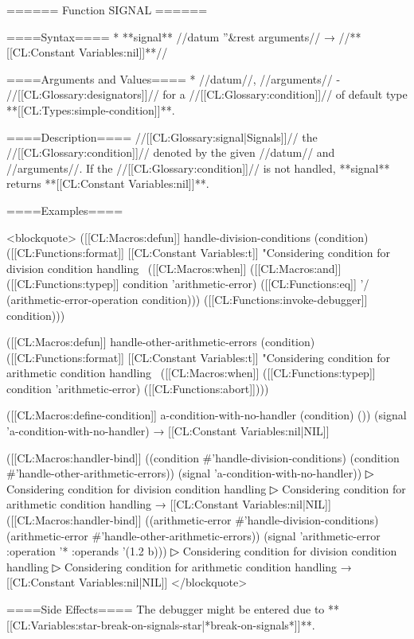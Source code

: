 ====== Function SIGNAL ======

====Syntax====
  * **signal** //datum ''&rest arguments// → //**[[CL:Constant Variables:nil]]**//

====Arguments and Values====
  * //datum//, //arguments// - //[[CL:Glossary:designators]]// for a //[[CL:Glossary:condition]]// of default type **[[CL:Types:simple-condition]]**.

====Description====
//[[CL:Glossary:signal|Signals]]// the //[[CL:Glossary:condition]]// denoted by the given //datum// and //arguments//. If the //[[CL:Glossary:condition]]// is not handled, **signal** returns **[[CL:Constant Variables:nil]]**.

====Examples====

<blockquote>
([[CL:Macros:defun]] handle-division-conditions (condition) 
  ([[CL:Functions:format]] [[CL:Constant Variables:t]] "Considering condition for division condition handling~%
          ([[CL:Macros:when]] ([[CL:Macros:and]] ([[CL:Functions:typep]] condition 'arithmetic-error) 
                     ([[CL:Functions:eq]] '/ (arithmetic-error-operation condition))) 
            ([[CL:Functions:invoke-debugger]] condition))) 

([[CL:Macros:defun]] handle-other-arithmetic-errors (condition) 
  ([[CL:Functions:format]] [[CL:Constant Variables:t]] "Considering condition for arithmetic condition handling~%
    ([[CL:Macros:when]] ([[CL:Functions:typep]] condition 'arithmetic-error) ([[CL:Functions:abort]]))) 

([[CL:Macros:define-condition]] a-condition-with-no-handler (condition) ())
(signal 'a-condition-with-no-handler) → [[CL:Constant Variables:nil|NIL]] 

([[CL:Macros:handler-bind]] ((condition #'handle-division-conditions) 
               (condition #'handle-other-arithmetic-errors)) 
  (signal 'a-condition-with-no-handler)) 
▷ Considering condition for division condition handling 
▷ Considering condition for arithmetic condition handling 
→ [[CL:Constant Variables:nil|NIL]] 
([[CL:Macros:handler-bind]] ((arithmetic-error #'handle-division-conditions) 
               (arithmetic-error #'handle-other-arithmetic-errors))
  (signal 'arithmetic-error :operation '* :operands '(1.2 b)))
▷ Considering condition for division condition handling
▷ Considering condition for arithmetic condition handling
→ [[CL:Constant Variables:nil|NIL]] 
</blockquote>

====Side Effects====
The debugger might be entered due to **[[CL:Variables:star-break-on-signals-star|*break-on-signals*]]**.

